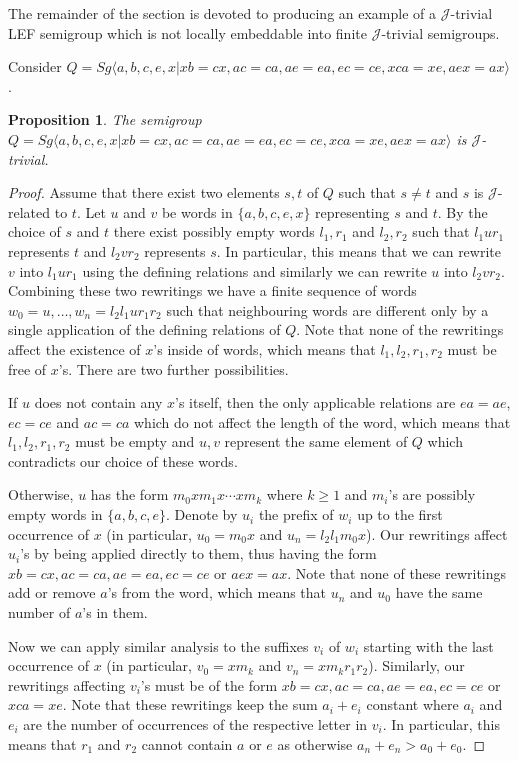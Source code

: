 \documentclass{article}
\newtheorem{proposition}{Proposition}
\theoremstyle{definition}
\def\J{\mathcal J}
\begin{document}
The remainder of the section is devoted to producing an example of a $\J$-trivial LEF semigroup which is not locally embeddable into finite $\J$-trivial semigroups.

Consider $Q = Sg \langle a,b,c,e,x | xb = cx, ac = ca, ae=ea, ec=ce, xca = xe, aex = ax\rangle$.

\begin{proposition}
The semigroup  $Q = Sg \langle a,b,c,e,x | xb = cx, ac = ca, ae=ea, ec=ce, xca = xe, aex = ax\rangle$ is $\J$-trivial.
\end{proposition}
\begin{proof}
Assume that there exist two elements $s,t$ of $Q$ such that $s \neq t$ and $s$ is $\J$-related to $t$. Let $u$ and $v$ be words in $\{a,b,c,e,x\}$ representing $s$ and $t$. By the choice of $s$ and $t$ there exist possibly empty words $l_1, r_1$ and $l_2, r_2$ such that $l_1 u r_1$ represents $t$ and $l_2 v r_2$ represents $s$. In particular, this means that we can rewrite $v$ into $l_1 u r_1$ using the defining relations and similarly we can rewrite $u$ into $l_2 v r_2$. Combining these two rewritings we have a finite sequence of words $w_0 = u, \ldots, w_n = l_2 l_1 u r_1 r_2$ such that neighbouring words are different only by a single application of the defining relations of $Q$. Note that none of the rewritings affect the existence of $x$'s inside of words, which means that $l_1, l_2, r_1, r_2$ must be free of $x$'s. There are two further possibilities.

If $u$ does not contain any $x$'s itself, then the only applicable relations are $ea = ae$, $ec=ce$ and $ac = ca$ which do not affect the length of the word, which means that $l_1,l_2, r_1, r_2$ must be empty and $u,v$ represent the same element of $Q$ which contradicts our choice of these words.

Otherwise, $u$ has the form $m_0 x m_1 x \cdots x m_k$ where $k \ge 1$ and $m_i$'s are possibly empty words in $\{a,b,c,e\}$. Denote by $u_i$ the prefix of $w_i$ up to the first occurrence of $x$ (in particular, $u_0 = m_0 x$ and $u_n = l_2 l_1 m_0 x$). Our rewritings affect $u_i$'s by being applied directly to them, thus having the form $xb = cx, ac = ca, ae=ea, ec=ce$ or  $aex = ax$. Note that none of these rewritings add or remove $a$'s from the word, which means that $u_n$ and $u_0$ have the same number of $a$'s in them.

Now we can apply similar analysis to the suffixes $v_i$ of $w_i$ starting with the last occurrence of $x$ (in particular, $v_0 =x m_k$ and $v_n = x m_k r_1 r_2$). Similarly, our rewritings affecting $v_i$'s must be of the form $xb = cx, ac = ca, ae=ea, ec=ce$ or $xca = xe$. Note that these rewritings keep  the sum $a_i + e_i$ constant where $a_i$ and $e_i$ are the number of occurrences of the respective letter in $v_i$. In particular, this means that $r_1$ and $r_2$ cannot contain $a$ or $e$ as otherwise $a_n + e_n > a_0 + e_0$. 


\end{proof}
\end{document}
